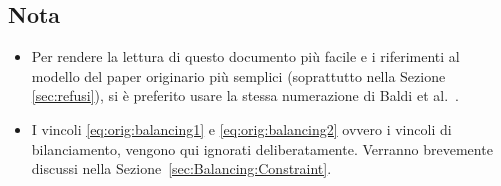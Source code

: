 \subsection{Nota}
\begin{itemize}
\item Per rendere la lettura di questo documento più facile e i riferimenti al 
modello
del paper originario più semplici (soprattutto nella Sezione \ref{sec:refusi}),
si è preferito usare la stessa numerazione di Baldi et al.~\cite{Baldi20129802}.
\item I vincoli \ref{eq:orig:balancing1} e \ref{eq:orig:balancing2}
 ovvero i vincoli di bilanciamento, vengono qui 
ignorati deliberatamente. Verranno brevemente discussi
nella Sezione~\ref{sec:Balancing:Constraint}.

\end{itemize}
